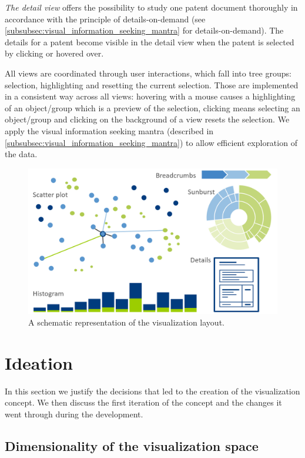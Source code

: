 \textit{The detail view} offers the possibility to study one patent document thoroughly in accordance with the principle of details-on-demand (see \autoref{subsubsec:visual_information_seeking_mantra} for details-on-demand).
The details for a patent become visible in the detail view when the patent is selected by clicking or hovered over.

All views are coordinated through user interactions, which fall into tree groups: selection, highlighting and resetting the current selection.
Those are implemented in a consistent way across all views: hovering with a mouse causes a highlighting of an object/group which is a preview of the selection, clicking means selecting an object/group and clicking on the background of a view resets the selection.
We apply the visual information seeking mantra (described in \autoref{subsubsec:visual_information_seeking_mantra}) to allow efficient exploration of the data.

\begin{figure}[!]
\centering
\includegraphics[width=\textwidth]{img/schematic}
\caption{A schematic representation of the visualization layout.}
\label{fig:schematic}
\end{figure}

\section{Ideation}
\label{sec:ideation}

In this section we justify the decisions that led to the creation of the visualization concept.
We then discuss the first iteration of the concept and the changes it went through during the development.

\subsection{Dimensionality of the visualization space}
\label{subsec:dimensionality_of_visualization_space}

